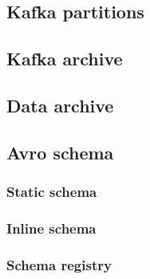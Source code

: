 \documentclass{article}
\begin{document}
\subsection{Kafka partitions}
\label{kafka-partitions}

\subsection{Kafka  archive}
\label{kafka-archive}

\subsection{Data archive}
\label{kafka-contention}



\subsection{Avro schema}
\label{avro-schema}

\subsubsection{Static schema}
\label{avro-schema.static}

\subsubsection{Inline schema}
\label{avro-schema.inline}

\subsubsection{Schema registry}
\label{avro-schema.registry}
\end{document}
